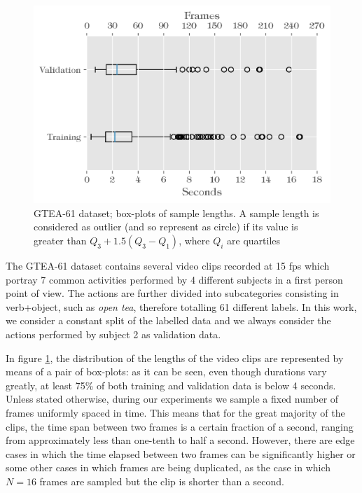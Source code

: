 \documentclass[10pt,twocolumn,letterpaper]{article}
\begin{document}
\begin{figure}
	\begin{center}
		\includegraphics[width=\linewidth]{grafici/GTEA61_boxplot.png}		
	\end{center}
	\caption{GTEA-61 dataset; box-plots of sample lengths. A sample length is considered as outlier (and so represent as circle) if its value is greater than $Q_3 + 1.5(Q_3-Q_1)$, where $Q_i$ are quartiles}
	\label{fig:GTEA61_boxplot}
\end{figure}

The GTEA-61 dataset contains several video clips recorded at 15 fps which portray 7 common activities performed by 4 different subjects in a first person point of view. The actions are further divided into subcategories consisting in verb+object, such as \textit{open tea}, therefore totalling 61 different labels. In this work, we consider a constant split of the labelled data and we always consider the actions performed by subject 2 as validation data.

In figure \ref{fig:GTEA61_boxplot}, the distribution of the lengths of the video clips are represented by means of a pair of box-plots: as it can be seen, even though durations vary greatly, at least 75\% of both training and validation data is below 4 seconds. Unless stated otherwise, during our experiments we sample a fixed number of frames uniformly spaced in time. This means that for the great majority of the clips, the time span between two frames is a certain fraction of a second, ranging from approximately less than one-tenth to half a second. However, there are edge cases in which the time elapsed between two frames can be significantly higher or some other cases in which frames are being duplicated, as the case in which $N = 16$ frames are sampled but the clip is shorter than a second.
\end{document}
